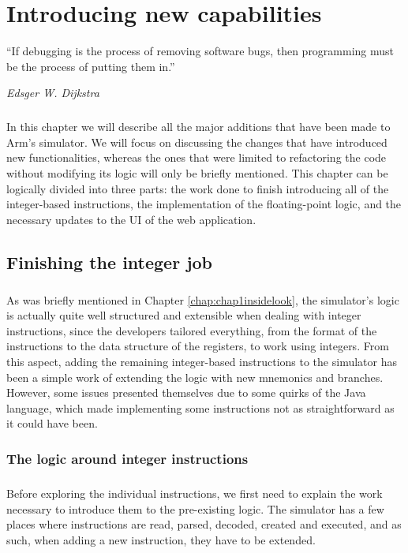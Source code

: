 \chapter{Introducing new capabilities}\label{chap:chap4}

\epigraph{``If debugging is the process of removing software bugs, then programming must be the process of putting them in.''}{\textit{Edsger W. Dijkstra}}

\paragraph{}
In this chapter we will describe all the major additions that have been made to Arm's simulator. We will focus on discussing the changes that have introduced new functionalities, whereas the ones that were limited to refactoring the code without modifying its logic will only be briefly mentioned. This chapter can be logically divided into three parts: the work done to finish introducing all of the integer-based instructions, the implementation of the floating-point logic, and the necessary updates to the UI of the web application.

\section{Finishing the integer job}\label{chap:chap4int}
\paragraph{}
As was briefly mentioned in Chapter \ref{chap:chap1insidelook}, the simulator's logic is actually quite well structured and extensible when dealing with integer instructions, since the developers tailored everything, from the format of the instructions to the data structure of the registers, to work using integers. From this aspect, adding the remaining integer-based instructions to the simulator has been a simple work of extending the logic with new mnemonics and branches. However, some issues presented themselves due to some quirks of the Java language, which made implementing some instructions not as straightforward as it could have been.
\subsection{The logic around integer instructions}
\paragraph{}
Before exploring the individual instructions, we first need to explain the work necessary to introduce them to the pre-existing logic. The simulator has a few places where instructions are read, parsed, decoded, created and executed, and as such, when adding a new instruction, they have to be extended.
